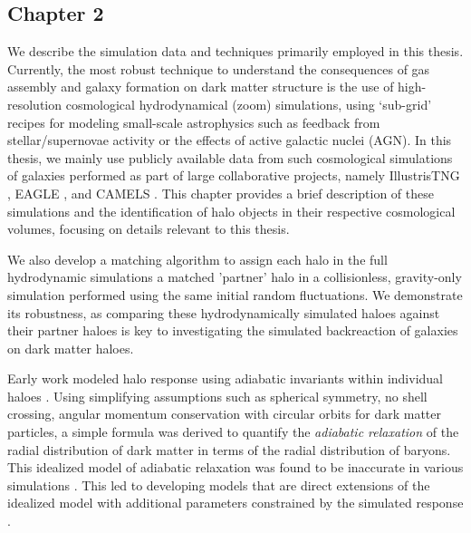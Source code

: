 \documentclass[a4paper, 12pt, oneside]{Thesis}  %
\begin{document}
\subsection*{Chapter 2}
We describe the simulation data and techniques primarily employed in this thesis. Currently, the most robust technique to understand the consequences of gas assembly and galaxy formation on dark matter structure is the use of high-resolution cosmological hydrodynamical (zoom) simulations, using `sub-grid' recipes for modeling small-scale astrophysics such as feedback from stellar/supernovae activity or the effects of active galactic nuclei (AGN). In this thesis, we mainly use publicly available data from such cosmological simulations of galaxies performed as part of large collaborative projects, namely IllustrisTNG \cite{2019ComAC...6....2N}, EAGLE \cite{2015MNRAS.446..521S}, and CAMELS \cite{CAMELS_presentation,CAMELS_DR1}. This chapter provides a brief description of these simulations and the identification of halo objects in their respective cosmological volumes, focusing on details relevant to this thesis.

We also develop a matching algorithm to assign each halo in the full hydrodynamic simulations a matched 'partner' halo in a collisionless, gravity-only simulation performed using the same initial random fluctuations. We demonstrate its robustness, as comparing these hydrodynamically simulated haloes against their partner haloes is key to investigating the simulated backreaction of galaxies on dark matter haloes.

Early work modeled halo response using adiabatic invariants within individual haloes \citep[][]{osti6457593,1984MNRAS.211..753B,1986ApJ...301...27B,1987ApJ...318...15R}. Using simplifying assumptions such as spherical symmetry, no shell crossing, angular momentum conservation with circular orbits for dark matter particles, a simple formula was derived to quantify the \emph{adiabatic relaxation} of the radial distribution of dark matter in terms of the radial distribution of baryons. This idealized model of adiabatic relaxation \citep[][]{1986ApJ...301...27B} was found to be inaccurate in various simulations \citep[see, e.g.,][]{2004ApJ...616...16G,2006PhRvD..74l3522G,2010MNRAS.402..776P,2010MNRAS.406..922T,2010MNRAS.405.2161D,2010MNRAS.407..435A,2011MNRAS.414..195T,2016MNRAS.461.2658D,2019A&A...622A.197A,2022MNRAS.511.3910F}. This led to developing models that are direct extensions of the idealized model with additional parameters constrained by the simulated response \citep{2010MNRAS.407..435A,2004ApJ...616...16G,2006PhRvD..74l3522G,2010MNRAS.405.2161D}.
\end{document}

